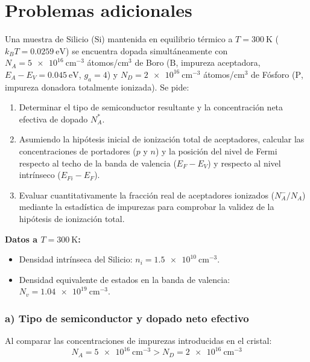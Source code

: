 \section{Problemas adicionales}
\setcounter{problemacontador}{1}
\begin{problema}
Una muestra de Silicio ($\text{Si}$) mantenida en equilibrio térmico a $T = \SI{300}{\kelvin}$ ($k_B T = \SI{0.0259}{\eV}$) se encuentra dopada simultáneamente con $N_A = \SI{5e16}{\cm^{-3}}$ átomos/cm$^3$ de Boro ($\text{B}$, impureza aceptadora, $E_A - E_V = \SI{0.045}{\eV}$, $g_a = 4$) y $N_D = \SI{2e16}{\cm^{-3}}$ átomos/cm$^3$ de Fósforo ($\text{P}$, impureza donadora totalmente ionizada). Se pide:

\begin{enumerate}[label=\alph*)]
    \item Determinar el tipo de semiconductor resultante y la concentración neta efectiva de dopado $N_A^*$.
    \item Asumiendo la hipótesis inicial de ionización total de aceptadores, calcular las concentraciones de portadores ($p$ y $n$) y la posición del nivel de Fermi respecto al techo de la banda de valencia ($E_F - E_V$) y respecto al nivel intrínseco ($E_{Fi} - E_F$).
    \item Evaluar cuantitativamente la fracción real de aceptadores ionizados ($N_A^- / N_A$) mediante la estadística de impurezas para comprobar la validez de la hipótesis de ionización total.
\end{enumerate}

\textbf{Datos a $T = \SI{300}{\kelvin}$:}
\begin{itemize}
    \item Densidad intrínseca del Silicio: $n_i = \SI{1.5e10}{\cm^{-3}}$.
    \item Densidad equivalente de estados en la banda de valencia: $N_v = \SI{1.04e19}{\cm^{-3}}$.
\end{itemize}

\tcblower

\subsubsection*{a) Tipo de semiconductor y dopado neto efectivo}

Al comparar las concentraciones de impurezas introducidas en el cristal:
\[
N_A = \SI{5e16}{\cm^{-3}} > N_D = \SI{2e16}{\cm^{-3}}
\]


\end{problema}
